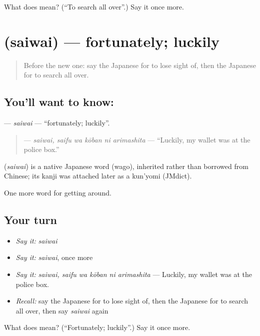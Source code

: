 \begin{tcolorbox}[breakable,colback=teal!4,colframe=teal!35!black,title={Before you move on}]
What does  mean? (\textquotedblleft{}To search all over\textquotedblright{}.) Say it once more.
\end{tcolorbox}
\section[\texorpdfstring{\ja{さいわい} (saiwai)}{さいわい (saiwai)}]{ (saiwai) — fortunately; luckily}

\label{lesson:JA-C424-saiwai}



\begin{quote}
Before the new one: say the Japanese for to lose sight of, then the Japanese for to search all over.
\end{quote}

\subsection*{You'll want to know: }
\textbf{} — \emph{saiwai} — \textquotedblleft{}fortunately; luckily\textquotedblright{}.

\begin{quote}
\textbf{  } — \emph{saiwai, saifu wa kōban ni arimashita} — \textquotedblleft{}Luckily, my wallet was at the police box.\textquotedblright{}
\end{quote}

\begin{cousinweb}
\textbf{} (\emph{saiwai}) is a native Japanese word (wago), inherited rather than borrowed from Chinese; its kanji was attached later as a kun'yomi (JMdict).
\end{cousinweb}

\begin{grammarlens}[title={What you've built}]
One more word for getting around.
\end{grammarlens}

\subsection*{Your turn}
\begin{itemize}
\raggedright
  \item \emph{Say it:} \emph{saiwai}
  \item \emph{Say it:} \emph{saiwai}, once more
  \item \emph{Say it:} \emph{saiwai, saifu wa kōban ni arimashita} — Luckily, my wallet was at the police box.
  \item \emph{Recall:} say the Japanese for to lose sight of, then the Japanese for to search all over, then say \emph{saiwai} again
\end{itemize}

\begin{tcolorbox}[breakable,colback=teal!4,colframe=teal!35!black,title={Before you move on}]
What does  mean? (\textquotedblleft{}Fortunately; luckily\textquotedblright{}.) Say it once more.
\end{tcolorbox}
